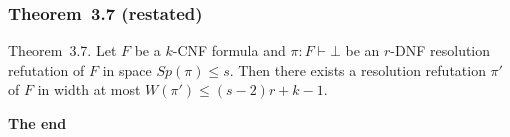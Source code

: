 \documentclass[t,usenames,dvipsnames]{beamer}
\begin{document}
\begin{frame} \frametitle{Theorem~3.7 (restated)}
	\begin{block}{Theorem~3.7.}
		Let $F$ be a $k$-CNF formula and $\pi : F \vdash \bot$ be an $r$-DNF resolution
		refutation of $F$ in space $Sp(\pi) \leq s$. Then there exists a resolution
		refutation $\pi'$ of $F$ in width at most $W(\pi') \leq (s-2)r + k -1$.
	\end{block}
	\pause \vfill \vfill \hfill \textbf{\Large\color{NavyBlue}The end}
\end{frame}
\end{document}
